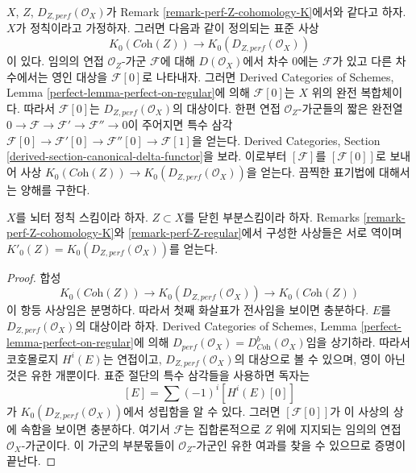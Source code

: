 \begin{remark}
\label{remark-perf-Z-regular}
$X$, $Z$, $D_{Z, perf}(\mathcal{O}_X)$가 Remark
\ref{remark-perf-Z-cohomology-K}에서와 같다고 하자. $X$가 정칙이라고
가정하자. 그러면 다음과 같이 정의되는 표준 사상
$$
K_0(\textit{Coh}(Z)) \longrightarrow K_0(D_{Z, perf}(\mathcal{O}_X))
$$
이 있다. 임의의 연접 $\mathcal{O}_Z$-가군 $\mathcal{F}$에 대해
$D(\mathcal{O}_X)$에서 차수 $0$에는 $\mathcal{F}$가 있고 다른
차수에서는 영인 대상을 $\mathcal{F}[0]$로 나타내자. 그러면 Derived
Categories of Schemes, Lemma \ref{perfect-lemma-perfect-on-regular}에
의해 $\mathcal{F}[0]$는 $X$ 위의 완전 복합체이다. 따라서
$\mathcal{F}[0]$는 $D_{Z, perf}(\mathcal{O}_X)$의 대상이다. 한편 연접
$\mathcal{O}_Z$-가군들의 짧은 완전열
$0 \to \mathcal{F} \to \mathcal{F}' \to \mathcal{F}'' \to 0$이 주어지면
특수 삼각
$\mathcal{F}[0] \to \mathcal{F}'[0] \to \mathcal{F}''[0] \to \mathcal{F}[1]$을
얻는다. Derived Categories, Section
\ref{derived-section-canonical-delta-functor}을 보라. 이로부터
$[\mathcal{F}]$를 $[\mathcal{F}[0]]$로 보내어 사상
$K_0(\textit{Coh}(Z)) \to K_0(D_{Z, perf}(\mathcal{O}_X))$을 얻는다.
끔찍한 표기법에 대해서는 양해를 구한다.
\end{remark}

\begin{lemma}
\label{lemma-perf-Z-regular}
$X$를 뇌터 정칙 스킴이라 하자. $Z \subset X$를 닫힌 부분스킴이라
하자. Remarks \ref{remark-perf-Z-cohomology-K}와
\ref{remark-perf-Z-regular}에서 구성한 사상들은 서로 역이며
$K'_0(Z) = K_0(D_{Z, perf}(\mathcal{O}_X))$를 얻는다.
\end{lemma}

\begin{proof}
합성
$$
K_0(\textit{Coh}(Z)) \longrightarrow
K_0(D_{Z, perf}(\mathcal{O}_X)) \longrightarrow
K_0(\textit{Coh}(Z))
$$
이 항등 사상임은 분명하다. 따라서 첫째 화살표가 전사임을 보이면
충분하다. $E$를 $D_{Z, perf}(\mathcal{O}_X)$의 대상이라 하자. Derived
Categories of Schemes, Lemma
\ref{perfect-lemma-perfect-on-regular}에 의해
$D_{perf}(\mathcal{O}_X) = D^b_{\textit{Coh}}(\mathcal{O}_X)$임을
상기하라. 따라서 코호몰로지 $H^i(E)$는 연접이고,
$D_{Z, perf}(\mathcal{O}_X)$의 대상으로 볼 수 있으며, 영이 아닌 것은
유한 개뿐이다. 표준 절단의 특수 삼각들을 사용하면 독자는
$$
[E] = \sum (-1)^i[H^i(E)[0]]
$$
가 $K_0(D_{Z, perf}(\mathcal{O}_X))$에서 성립함을 알 수 있다. 그러면
$[\mathcal{F}[0]]$가 이 사상의 상에 속함을 보이면 충분하다. 여기서
$\mathcal{F}$는 집합론적으로 $Z$ 위에 지지되는 임의의 연접
$\mathcal{O}_X$-가군이다. 이 가군의 부분몫들이 $\mathcal{O}_Z$-가군인 유한 여과를
찾을 수 있으므로 증명이 끝난다.
\end{proof}

